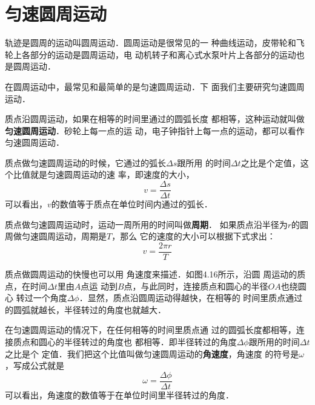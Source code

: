 \section{匀速圆周运动}
    轨迹是圆周的运动叫圆周运动．圆周运动是很常见的一
种曲线运动，皮带轮和飞轮上各部分的运动是圆周运动，电
动机转子和离心式水泵叶片上各部分的运动也是圆周运动．

    在圆周运动中，最常见和最简单的是匀速圆周运动．下
面我们主要研究匀速圆周运动．

    质点沿圆周运动，如果在相等的时间里通过的圆弧长度
都相等，这种运动就叫做\textbf{匀速圆周运动}．砂轮上每一点的运
动，电子钟指针上每一点的运动，都可以看作匀速圆周运动．

    质点做匀速圆周运动的时候，它通过的弧长$\Delta s$跟所用
的时间$\Delta t$之比是个定值，这个比值就是匀速圆周运动的速
率，即速度的大小，
\[v=\frac{\Delta s}{\Delta t} \]
可以看出，$v$的数值等于质点在单位时间内通过的弧长．

    质点做匀速圆周运动时，运动一周所用的时间叫做\textbf{周期}．
如果质点沿半径为$r$的圆周做匀速圆周运动，周期是$T$，那么
它的速度的大小可以根据下式求出：
\begin{equation}
v=\frac{2\pi r}{T}
\end{equation}

    质点做圆周运动的快慢也可以用
角速度来描述．如图4.16所示，沿圆
周运动的质点，在时间$\Delta t$里由$A$点运
动到$B$点，与此同时，连接质点和圆心的半径$OA$也绕圆心
转过一个角度$\Delta \phi$．显然，质点沿圆周运动得越快，在相等的
时间里质点通过的圆弧就越长，半径转过的角度也就越大．

\begin{figure}[htp]
\centering
{}
\caption{}
\end{figure}

    在匀速圆周运动的情况下，在任何相等的时间里质点通
过的圆弧长度都相等，连接质点和圆心的半径转过的角度也
都相等．即半径转过的角度$\Delta \phi$跟所用的时间$\Delta t$之比是个
定值．我们把这个比值叫做匀速圆周运动的\textbf{角速度}，角速度
的符号是$\omega$，写成公式就是
\[\omega=\frac{\Delta \phi}{\Delta t}\]
可以看出，角速度的数值等于在单位时间里半径转过的角度．

